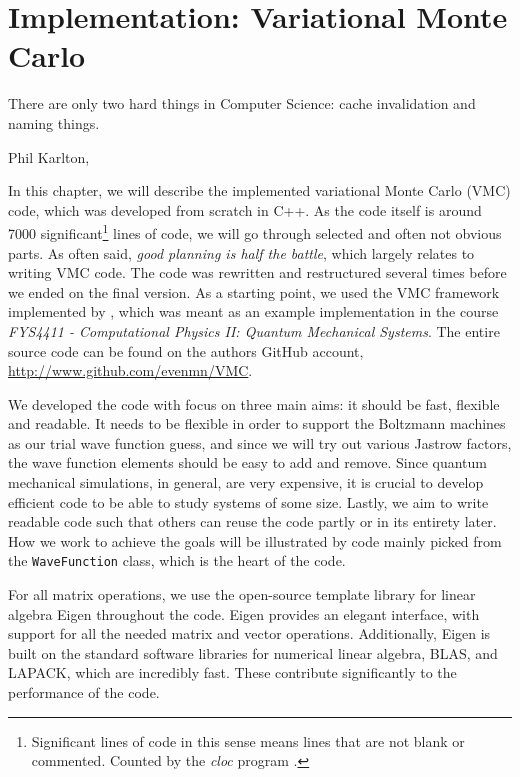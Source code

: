 \chapter{Implementation: Variational Monte Carlo} \label{chp:WFE}
\epigraph{There are only two hard things in Computer Science: cache invalidation and naming things.}{Phil Karlton, \cite{fowler_bliki:_nodate}}
\iffalse
\begin{figure}[H]
	\centering
	\texttt{[image: Images/example.png]}
	\caption{Caption}
\end{figure}
\fi

In this chapter, we will describe the implemented variational Monte Carlo (VMC) code, which was developed from scratch in C++. As the code itself is around 7000 significant\footnote{Significant lines of code in this sense means lines that are not blank or commented. Counted by the \textit{cloc} program \cite{aldanial_cloc_2019}.} lines of code, we will go through selected and often not obvious parts. As often said, \textit{good planning is half the battle}, which largely relates to writing VMC code. The code was rewritten and restructured several times before we ended on the final version. As a starting point, we used the VMC framework implemented by \citet{ledum_simple_2016}, which was meant as an example implementation in the course \textit{FYS4411 - Computational Physics II: Quantum Mechanical Systems}. The entire source code can be found on the authors GitHub account, \url{http://www.github.com/evenmn/VMC}.

We developed the code with focus on three main aims: it should be fast, flexible and readable. It needs to be flexible in order to support the Boltzmann machines as our trial wave function guess, and since we will try out various Jastrow factors, the wave function elements should be easy to add and remove. Since quantum mechanical simulations, in general, are very expensive, it is crucial to develop efficient code to be able to study systems of some size. Lastly, we aim to write readable code such that others can reuse the code partly or in its entirety later.  How we work to achieve the goals will be illustrated by code mainly picked from the \lstinline{WaveFunction} class, which is the heart of the code.

For all matrix operations, we use the open-source template library for linear algebra Eigen throughout the code. Eigen provides an elegant interface, with support for all the needed matrix and vector operations. Additionally, Eigen is built on the standard software libraries for numerical linear algebra, BLAS, and LAPACK, which are incredibly fast. These contribute significantly to the performance of the code. 

